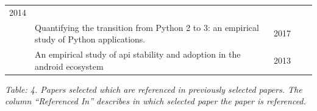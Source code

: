 \documentclass[]{book}
\begin{document}
\begin{longtable}[]{@{}lllll@{}}
\begin{minipage}[t]{0.02\columnwidth}
2014\strut
\end{minipage} & \begin{minipage}[t]{0.24\columnwidth}\raggedright\strut
\strut
\end{minipage} & \begin{minipage}[t]{0.16\columnwidth}\raggedright\strut
\citet{Raemaekers2017}\strut
\end{minipage}\tabularnewline
\begin{minipage}[t]{0.12\columnwidth}\raggedright\strut
\citet{Malloy2017}\strut
\end{minipage} & \begin{minipage}[t]{0.31\columnwidth}\raggedright\strut
Quantifying the transition from Python 2 to 3: an empirical study of
Python applications.\strut
\end{minipage} & \begin{minipage}[t]{0.02\columnwidth}\raggedright\strut
2017\strut
\end{minipage} & \begin{minipage}[t]{0.24\columnwidth}\raggedright\strut
\strut
\end{minipage} & \begin{minipage}[t]{0.16\columnwidth}\raggedright\strut
\citet{Malloy2018}\strut
\end{minipage}\tabularnewline
\begin{minipage}[t]{0.12\columnwidth}\raggedright\strut
\citet{McDonnell2013}\strut
\end{minipage} & \begin{minipage}[t]{0.31\columnwidth}\raggedright\strut
An empirical study of api stability and adoption in the android
ecosystem\strut
\end{minipage} & \begin{minipage}[t]{0.02\columnwidth}\raggedright\strut
2013\strut
\end{minipage} & \begin{minipage}[t]{0.24\columnwidth}\raggedright\strut
\strut
\end{minipage} & \begin{minipage}[t]{0.16\columnwidth}\raggedright\strut
\citet{Manikas2016}\strut
\end{minipage}\tabularnewline
\bottomrule
\end{longtable}

\emph{Table: 4. Papers selected which are referenced in previously
selected papers. The column ``Referenced In'' describes in which
selected paper the paper is referenced.}
\end{document}

